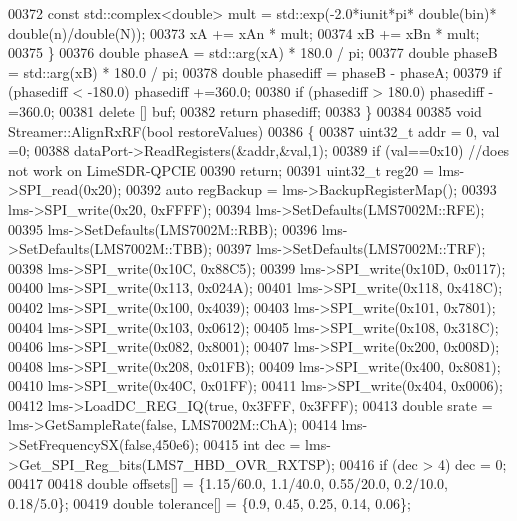 \begin{DoxyCode}
00372         \textcolor{keyword}{const} std::complex<double> mult = std::exp(-2.0*iunit*pi* \textcolor{keywordtype}{double}(bin)* \textcolor{keywordtype}{double}(n)/\textcolor{keywordtype}{double}(N));
00373         xA += xAn * mult;
00374         xB += xBn * mult;
00375     \}
00376     \textcolor{keywordtype}{double} phaseA = std::arg(xA) * 180.0 / pi;
00377     \textcolor{keywordtype}{double} phaseB = std::arg(xB) * 180.0 / pi;
00378     \textcolor{keywordtype}{double} phasediff = phaseB - phaseA;
00379     \textcolor{keywordflow}{if} (phasediff < -180.0) phasediff +=360.0;
00380     \textcolor{keywordflow}{if} (phasediff > 180.0) phasediff -=360.0;
00381     \textcolor{keyword}{delete} [] buf;
00382     \textcolor{keywordflow}{return} phasediff;
00383 \}
00384 
00385 \textcolor{keywordtype}{void} Streamer::AlignRxRF(\textcolor{keywordtype}{bool} restoreValues)
00386 \{
00387     uint32\_t addr = 0, val =0;
00388     dataPort->ReadRegisters(&addr,&val,1);
00389     \textcolor{keywordflow}{if} (val==0x10) \textcolor{comment}{//does not work on LimeSDR-QPCIE}
00390         \textcolor{keywordflow}{return};
00391     uint32\_t reg20 = lms->SPI_read(0x20);
00392     \textcolor{keyword}{auto} regBackup = lms->BackupRegisterMap();
00393     lms->SPI_write(0x20, 0xFFFF);
00394     lms->SetDefaults(LMS7002M::RFE);
00395     lms->SetDefaults(LMS7002M::RBB);
00396     lms->SetDefaults(LMS7002M::TBB);
00397     lms->SetDefaults(LMS7002M::TRF);
00398     lms->SPI_write(0x10C, 0x88C5);
00399     lms->SPI_write(0x10D, 0x0117);
00400     lms->SPI_write(0x113, 0x024A);
00401     lms->SPI_write(0x118, 0x418C);
00402     lms->SPI_write(0x100, 0x4039);
00403     lms->SPI_write(0x101, 0x7801);
00404     lms->SPI_write(0x103, 0x0612);
00405     lms->SPI_write(0x108, 0x318C);
00406     lms->SPI_write(0x082, 0x8001);
00407     lms->SPI_write(0x200, 0x008D);
00408     lms->SPI_write(0x208, 0x01FB);
00409     lms->SPI_write(0x400, 0x8081);
00410     lms->SPI_write(0x40C, 0x01FF);
00411     lms->SPI_write(0x404, 0x0006);
00412     lms->LoadDC_REG_IQ(\textcolor{keyword}{true}, 0x3FFF, 0x3FFF);
00413     \textcolor{keywordtype}{double} srate = lms->GetSampleRate(\textcolor{keyword}{false}, LMS7002M::ChA);
00414     lms->SetFrequencySX(\textcolor{keyword}{false},450e6);
00415     \textcolor{keywordtype}{int} dec = lms->Get_SPI_Reg_bits(LMS7_HBD_OVR_RXTSP);
00416     \textcolor{keywordflow}{if} (dec > 4) dec = 0;
00417 
00418     \textcolor{keywordtype}{double} offsets[] = \{1.15/60.0, 1.1/40.0, 0.55/20.0, 0.2/10.0, 0.18/5.0\};
00419     \textcolor{keywordtype}{double} tolerance[] = \{0.9, 0.45, 0.25, 0.14, 0.06\};

\end{DoxyCode}
